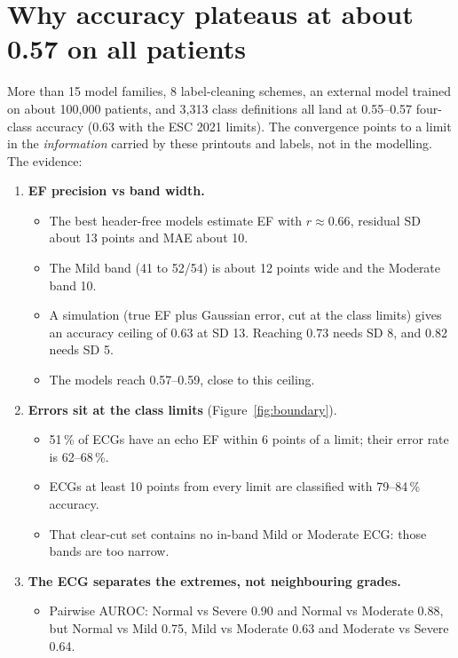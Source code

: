 \section{Why accuracy plateaus at about 0.57 on all patients}\label{sec:why}
More than 15 model families, 8 label-cleaning schemes, an external model trained on about 100,000 patients, and 3,313
class definitions all land at 0.55--0.57 four-class accuracy (0.63 with the ESC 2021 limits). The convergence points
to a limit in the \emph{information} carried by these printouts and labels, not in the modelling. The evidence:

\begin{enumerate}
  \item \textbf{EF precision vs band width.}
    \begin{itemize}
      \item The best header-free models estimate EF with $r\approx0.66$, residual SD about 13 points and MAE about 10.
      \item The Mild band (41 to 52/54) is about 12 points wide and the Moderate band 10.
      \item A simulation (true EF plus Gaussian error, cut at the class limits) gives an accuracy ceiling of 0.63 at
        SD 13. Reaching 0.73 needs SD 8, and 0.82 needs SD 5.
      \item The models reach 0.57--0.59, close to this ceiling.
    \end{itemize}
  \item \textbf{Errors sit at the class limits} (Figure~\ref{fig:boundary}).
    \begin{itemize}
      \item 51\,\% of ECGs have an echo EF within 6 points of a limit; their error rate is 62--68\,\%.
      \item ECGs at least 10 points from every limit are classified with 79--84\,\% accuracy.
      \item That clear-cut set contains no in-band Mild or Moderate ECG: those bands are too narrow.
    \end{itemize}
  \item \textbf{The ECG separates the extremes, not neighbouring grades.}
    \begin{itemize}
      \item Pairwise AUROC: Normal vs Severe 0.90 and Normal vs Moderate 0.88, but Normal vs Mild 0.75, Mild vs
        Moderate 0.63 and Moderate vs Severe 0.64.

\end{itemize}
\end{enumerate}
